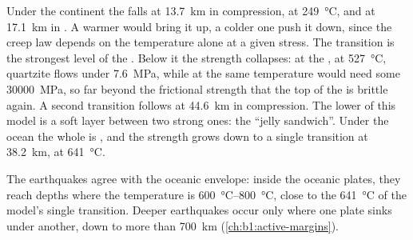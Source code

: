 Under the continent the  falls at \qty{13.7}{km}
in compression, at \qty{249}{\degreeCelsius}, and at \qty{17.1}{km} in
. A warmer  would bring it up, a colder one push it down,
since the creep law depends on the temperature alone at a given stress. The
transition is the strongest level of the .
Below it the strength collapses: at the , at \qty{527}{\degreeCelsius},
quartzite flows under \qty{7.6}{MPa}, while  at the same temperature
would need some \qty{30000}{MPa}, so far beyond the frictional strength that
the top of the  is brittle again. A second transition follows at
\qty{44.6}{km} in compression. The lower  of this model is a soft layer
between two strong ones: the ``jelly sandwich''. Under the ocean the whole
 is , and the strength grows down to a single transition at
\qty{38.2}{km}, at \qty{641}{\degreeCelsius}.

The earthquakes agree with the oceanic envelope: inside the oceanic plates,
they reach depths where the temperature is
\qtyrange{600}{800}{\degreeCelsius}, close to the \qty{641}{\degreeCelsius}
of the model's single transition. Deeper earthquakes occur only where one
plate sinks under another, down to more than \qty{700}{km}
(\cref{ch:b1:active-margins}).

